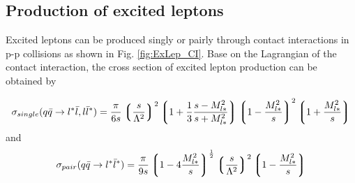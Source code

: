 \subsection{Production of excited leptons}
\label{sec:production}
Excited leptons can be produced singly or pairly through contact interactions in p-p collisions as shown in Fig. \ref{fig:ExLep_CI}. Base on the Lagrangian of the contact interaction, the cross section of excited lepton production can be obtained by

\begin{align}
\sigma_{single}(q\bar{q}\rightarrow l^{*}\bar{l}, l\bar{l}^{*}) = \frac{\pi}{6s} \left\lgroup \frac{s}{\Lambda^{2}}\right\rgroup^{2} \left\lgroup 1 + \frac{1}{3}\frac{s - M_{l*}^{2}}{s + M_{l*}^{2}}\right\rgroup \left\lgroup 1 - \frac{M_{l*}^{2}}{s} \right\rgroup^{2} \left\lgroup 1 + \frac{M_{l*}^{2}}{s} \right\rgroup 
\end{align}
\noindent and
\begin{align}
\sigma_{pair}(q\bar{q}\rightarrow l^{*}\bar{l}^{*}) = \frac{\pi}{9s}\left\lgroup 1 - 4\frac{M_{l*}^{2}}{s}\right\rgroup^{\frac{1}{2}} \left\lgroup \frac{s}{\Lambda^{2}}\right\rgroup^{2} \left\lgroup 1 - \frac{M_{l*}^{2}}{s}\right\rgroup
\end{align}

